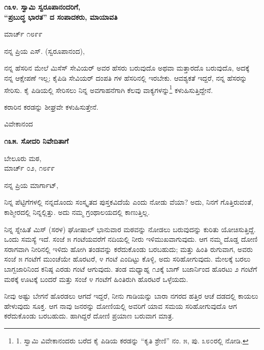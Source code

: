 \begin{center}
\textbf{೧೩೪. ಸ್ವಾಮಿ ಸ್ವರೂಪಾನಂದರಿಗೆ,\\“ಪ್ರಬುದ್ಧ ಭಾರತ” ದ ಸಂಪಾದಕರು, ಮಾಯಾವತಿ}
\end{center}

\begin{flushright}
ಮಾರ್ಚ್ ೧೮೯೯
\end{flushright}

ನನ್ನ ಪ್ರಿಯ ಎಸ್. (ಸ್ವರೂಪಾನಂದ),

ನನ್ನ ಹೆಸರಿನ ಮೇಲೆ ಮಿಸೆಸ್ ಸೇವಿಯರ್ ಅವರ ಹೆಸರು ಬರುವುದೊ ಅಥವಾ ಮತ್ತಾರದೊ ಬರುವುದೊ, ಅದಕ್ಕೆ ನನ್ನ ಆಕ್ಷೇಪಣೆ ಇಲ್ಲ; ಕೈಪಿಡಿ ಸೇವಿಯರ್ ದಂಪತಿ ಗಳ ಹೆಸರಿನಲ್ಲಿ ಇರಬೇಕು. ಆವಶ್ಯಕತೆ ಇದ್ದರೆ, ನನ್ನ ಹೆಸರನ್ನು ಸೇರಿಸು. ಕೈ ಪಿಡಿಯಲ್ಲಿ ಸೇರಿಸಲು ನಿನ್ನ ಅವಗಾಹನೆಗಾಗಿ ಕೆಲವು ವಾಕ್ಯಗಳನ್ನು\footnote{1. ಸ್ವಾಮಿ ವಿವೇಕಾನಂದರು ಬರೆದ ಕೈ ಪಿಡಿಯ ಕರಡನ್ನು “ಕೃತಿ ಶ್ರೇಣಿ” ನಂ. ೫, ಪು. ೩೮೦ರಲ್ಲಿ ನೋಡಿ.} ಕಳುಹಿಸುತ್ತಿದ್ದೇನೆ.

ಕರಾರಿನ ಕರಡನ್ನು ಶೀಘ್ರವೇ ಕಳುಹಿಸುತ್ತೇನೆ.

\begin{flushright}
ವಿವೇಕಾನಂದ
\end{flushright}

\begin{center}
\textbf{೧೩೫. ಸೋದರಿ ನಿವೇದಿತಾಗೆ}
\end{center}

\begin{flushright}
ಬೇಲೂರು ಮಠ,\\ಮಾರ್ಚ್ ೦೨, ೧೮೯೯
\end{flushright}

ನನ್ನ ಪ್ರಿಯ ಮಾರ್ಗಾಟ್,

ನಿನ್ನ ಪೆಟ್ಟಿಗೆಗಳಲ್ಲಿ ನನ್ನದೊಂದು ಸಂಸ್ಕೃತದ ಪುಸ್ತಕವಿದೆಯೆ ಎಂದು ನೋಡು ವೆಯಾ? ಅದು, ನಿನಗೆ ಗೊತ್ತಿರುವಂತೆ, ಕಾಶ್ಮೀರದಲ್ಲಿ ನಿನ್ನಲ್ಲಿತ್ತು. ಅದು ನಮ್ಮ ಗ್ರಂಥಾಲಯದಲ್ಲಿ ಕಾಣುತ್ತಿಲ್ಲ.

ನಿನ್ನ ಸ್ನೇಹಿತೆ ಮಿಸ್ (ಸರಳ) ಘೋಷಾಲ್ ಭಾನುವಾರ ಮಠವನ್ನು ನೋಡಲು ಬರುವುದನ್ನು ಕುರಿತು ಯೋಚಿಸುತ್ತಿದ್ದೆ. ಒಂದು ಸಮಸ್ಯೆ ಇದೆ. ಸಂಜೆ ೫ ಗಂಟೆಯವರೆಗೆ ನದಿಯಲ್ಲಿ ನೀರು ಇಳಿಮುಖವಾಗುವುದು. ಆಗ ನಮ್ಮ ದೊಡ್ಡ ದೋಣಿ ಸರಾಗವಾಗಿ ನೀರಿನಲ್ಲಿ ಇಳಿದು ಹೋಗಿ ತಂಡವನ್ನು ಕರೆದುಕೊಂಡು ಬರಬಹುದು; ಮತ್ತು ಹಿಂತಿ ರುಗುವಾಗ, ಅವರು ಸಂಜೆ ೫ ಗಂಟೆಗೆ ಮುಂಚೆಯೇ ಹೊರಟರೆ, ೪ ಗಂಟೆ ಎಂದಿಟ್ಟು ಕೊಳ್ಳಿ, ಅದು ಸರಿಹೋಗುವುದು. ಮೇಲಕ್ಕೆ ಬರಲು ಬಾಗ್ಬಜಾರಿನಿಂದ ಕನಿಷ್ಠ ಎರಡು ಗಂಟೆ ಆಗುವುದು. ತಂಡ ಮಧ್ಯಾಹ್ನ ೧೨ಕ್ಕೆ ಬಾಗ್ ಬಜಾರ್ನಿಂದ ಹೊರಟು ೨ ಗಂಟೆಗೆ ಮಠಕ್ಕೆ ಊಟಕ್ಕೆ ಬಂದರೆ ಮತ್ತು ಸಂಜೆ ೪ ಗಂಟೆಗೆ ಹಿಂತಿರುಗಿ ಹೊರಟರೆ ಒಳ್ಳೆಯದು.

ನೀವು ಅಷ್ಟು ಬೇಗನೆ ಹೊರಡಲು ಆಗದೆ ಇದ್ದರೆ, ನೀನು ಗಾಡಿಯನ್ನು ಬಾರಾ ನಗರದ ಹತ್ತಿರ ಆಚೆ ದಡದಲ್ಲಿ ಕಾಯಲು ಹೇಳುವುದು ಸೂಕ್ತ. ಆಗ ನಾವು ಜನರನ್ನು ದೋಣಿಯಲ್ಲಿ ಅವರಿಗೆ ಯಾವ ಸಮಯ ಸರಿಹೋಗುವುದೊ ಆಗ ಕರೆದುಕೊಂಡು ಬರಬಹುದು. ಹಾಗಿದ್ದರೆ ದೋಣಿ ಪ್ರಯಾಣ ಬರುವಾಗ ಮಾತ್ರ.

